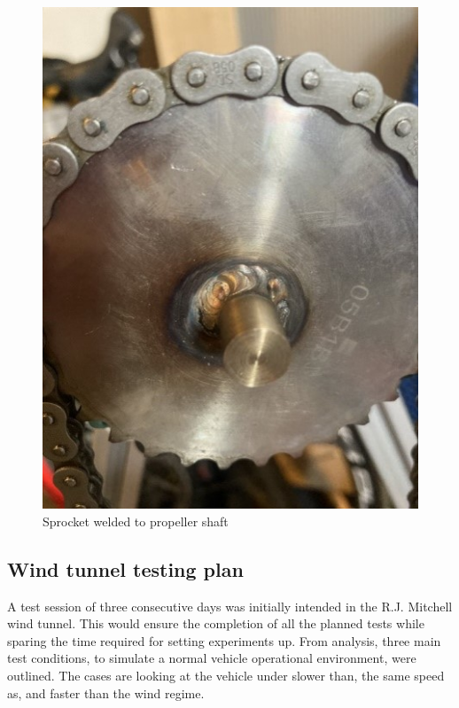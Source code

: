 \begin{figure}[!htbp]
    \centering
    \includegraphics{images/part10/chaincog.jpg}
    \caption{Sprocket welded to propeller shaft}
    \label{fig:weldedsprocket}
\end{figure}

\subsection{Wind tunnel testing plan}

A test session of three consecutive days was initially intended in the R.J. Mitchell wind tunnel. This would ensure the completion of all the planned tests while sparing the time required for setting experiments up. From analysis, three main test conditions, to simulate a normal vehicle operational environment, were outlined. The cases are looking at the vehicle under slower than, the same speed as, and faster than the wind regime.

